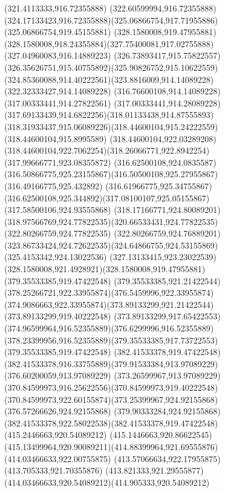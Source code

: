 {{		\lineto(321.4113333,916.72355888)
		\lineto(322.60599994,916.72355888)
		\curveto(324.17133423,916.72355888)(325.06866754,917.71955886)(325.06866754,919.45155881)
		\moveto(328.1580008,919.47955881)
		\curveto(328.1580008,918.24355884)(327.75400081,917.02755888)(327.04960083,916.14889223)
		\curveto(326.73893417,915.75822557)(326.35626751,915.40755892)(325.90826752,915.10622559)
		\curveto(324.85360088,914.40222561)(323.8816009,914.14089228)(322.32333427,914.14089228)
		\lineto(316.76600108,914.14089228)
		\lineto(317.00333441,914.27822561)
		\curveto(317.00333441,914.28089228)(317.69133439,914.6822256)(318.01133438,914.87555893)
		\curveto(318.31933437,915.06089226)(318.44600104,915.24222559)(318.44600104,915.8995589)
		\lineto(318.44600104,922.03289208)
		\curveto(318.44600104,922.7062254)(318.26066771,922.8942254)(317.99666771,923.08355872)
		\curveto(316.62500108,924.0835587)(316.50866775,925.23155867)(316.50500108,925.27955867)
		\lineto(316.49166775,925.432892)
		\lineto(316.61966775,925.34755867)
		\curveto(316.62500108,925.344892)(317.08100107,925.05155867)(317.58500106,924.93555868)
		\curveto(318.17166771,924.80089201)(318.97566769,924.77822535)(320.66533431,924.77822535)
		\lineto(322.80266759,924.77822535)
		\lineto(322.80266759,924.76889201)
		\curveto(323.86733424,924.72622535)(324.64866755,924.53155869)(325.4153342,924.13022536)
		\curveto(327.13133415,923.23022539)(328.1580008,921.4928921)(328.1580008,919.47955881)
		\moveto(379.35533385,919.47422548)
		\curveto(379.35533385,921.21422544)(378.25266721,922.33955874)(376.5459996,922.33955874)
		\curveto(374.9086663,922.33955874)(373.89133299,921.21422544)(373.89133299,919.40222548)
		\curveto(373.89133299,917.65422553)(374.96599964,916.52355889)(376.6299996,916.52355889)
		\curveto(378.23399956,916.52355889)(379.35533385,917.73722553)(379.35533385,919.47422548)
		\moveto(382.41533378,919.47422548)
		\curveto(382.41533378,916.33755889)(379.91533384,913.97089229)(376.60200059,913.97089229)
		\curveto(373.26599967,913.97089229)(370.84599973,916.25622556)(370.84599973,919.40222548)
		\curveto(370.84599973,922.60155874)(373.25399967,924.92155868)(376.57266626,924.92155868)
		\curveto(379.90333284,924.92155868)(382.41533378,922.58022538)(382.41533378,919.47422548)
		\moveto(415.2446663,920.54089212)
		\lineto(415.1446663,920.86622545)
		\curveto(415.13499964,920.90089211)(414.88399964,921.69555876)(414.03466633,922.00755875)
		\lineto(413.57066634,922.17955875)
		\lineto(413.705333,921.70355876)
		\curveto(413.821333,921.29555877)(414.03466633,920.54089212)(414.905333,920.54089212)
		\closepath
}}
